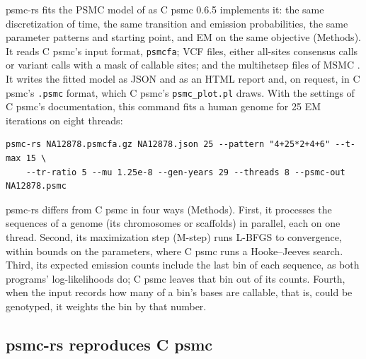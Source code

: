 \documentclass[11pt]{article}
\newcommand{\psmcrs}{psmc-rs}
\begin{document}
\psmcrs{} fits the PSMC model of \citet{li2011} as C psmc 0.6.5 implements it: the same discretization of time, the same transition and emission probabilities, the same parameter patterns and starting point, and EM on the same objective (Methods). It reads C psmc's input format, \texttt{psmcfa}; VCF files, either all-sites consensus calls or variant calls with a mask of callable sites; and the multihetsep files of MSMC \citep{schiffels2014}. It writes the fitted model as JSON and as an HTML report and, on request, in C psmc's \texttt{.psmc} format, which C psmc's \texttt{psmc\_plot.pl} draws. With the settings of C psmc's documentation, this command fits a human genome for 25 EM iterations on eight threads:
\begin{verbatim}
psmc-rs NA12878.psmcfa.gz NA12878.json 25 --pattern "4+25*2+4+6" --t-max 15 \
    --tr-ratio 5 --mu 1.25e-8 --gen-years 29 --threads 8 --psmc-out NA12878.psmc
\end{verbatim}
\psmcrs{} differs from C psmc in four ways (Methods). First, it processes the sequences of a genome (its chromosomes or scaffolds) in parallel, each on one thread. Second, its maximization step (M-step) runs L-BFGS to convergence, within bounds on the parameters, where C psmc runs a Hooke--Jeeves search. Third, its expected emission counts include the last bin of each sequence, as both programs' log-likelihoods do; C psmc leaves that bin out of its counts. Fourth, when the input records how many of a bin's bases are callable, that is, could be genotyped, it weights the bin by that number.

\subsection*{\psmcrs{} reproduces C psmc}
\end{document}
